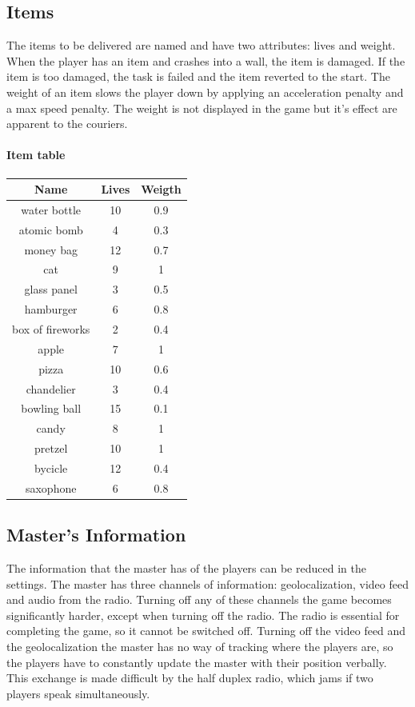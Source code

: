 \documentclass[12pt]{article}
\begin{document}
\subsection{Items}
The items to be delivered are named and have two attributes: lives and weight. When the player has an item and crashes into a wall, the item is damaged. If the item is too damaged, the task is failed and the item reverted to the start. The weight of an item slows the player down by applying an acceleration penalty and a max speed penalty. The weight is not displayed in the game but it's effect are apparent to the couriers.

\paragraph{Item table}

\begin{center}
\begin{tabular}{ |c|c|c| } 
 \hline
 Name & Lives & Weigth \\ 
\hline
water bottle & 10 & 0.9\\
atomic bomb & 4 & 0.3\\
money bag & 12 & 0.7\\
cat & 9 & 1\\
glass panel & 3 & 0.5\\
hamburger & 6 & 0.8\\
box of fireworks & 2 & 0.4\\
apple & 7 & 1\\
pizza & 10 & 0.6\\
chandelier & 3 & 0.4\\
bowling ball & 15 & 0.1\\
candy & 8 & 1\\
pretzel & 10 & 1\\
bycicle & 12 & 0.4\\
saxophone & 6 & 0.8\\
 \hline
\end{tabular}
\end{center}

\subsection{Master's Information}
The information that the master has of the players can be reduced in the settings. The master has three channels of information: geolocalization, video feed and audio from the radio. Turning off any of these channels the game becomes significantly harder, except when turning off the radio. The radio is essential for completing the game, so it cannot be switched off. Turning off the video feed and the geolocalization the master has no way of tracking where the players are, so the players have to constantly update the master with their position verbally. This exchange is made difficult by the half duplex radio, which jams if two players speak simultaneously.
\end{document}
